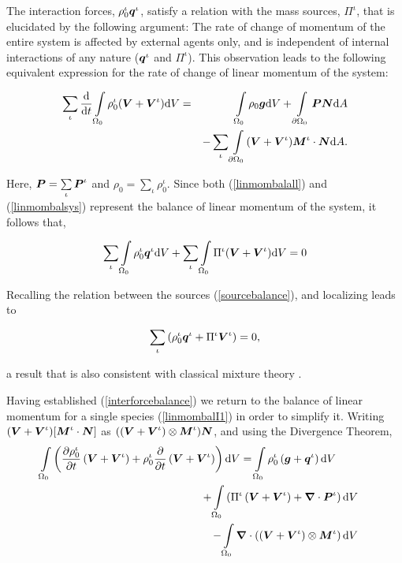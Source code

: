 The interaction forces, $\rho_0^\iota\mbox{\boldmath$ q$}^\iota$, satisfy a
relation with the mass sources, $\Pi^\iota$, that is elucidated by
the following argument: The rate of change of momentum of the
entire system is affected by external agents only, and is
independent of internal interactions of any nature ($\mbox{\boldmath$ q$}^\iota$
and $\Pi^\iota$). This observation leads to the following
equivalent expression for the rate of change of linear momentum of
the system:

\begin{eqnarray}
\sum\limits_{\iota}\frac{\mathrm{d}}{\mathrm{d}t}
\int\limits_{\Omega_0} \rho_0^\iota(\mbox{\boldmath$ V$}+\mbox{\boldmath$ V$}^\iota) \mathrm{d}V &=&
\int\limits_{\Omega_0}\rho_0\mbox{\boldmath$ g$} \mathrm{d}V +
\int\limits_{\partial \Omega_0}\mbox{\boldmath$ P$}\mbox{\boldmath$ N$} \mathrm{d}A \nonumber\\
& &- \sum\limits_{\iota}\int\limits_{\partial
\Omega_0}(\mbox{\boldmath$ V$}+\mbox{\boldmath$ V$}^\iota)\mbox{\boldmath$ M$}^\iota\cdot\mbox{\boldmath$ N$} \mathrm{d}A.
\label{linmombalsys}
\end{eqnarray}

\noindent Here, $\mbox{\boldmath$ P$} = \sum\limits_{\iota}\mbox{\boldmath$ P$}^\iota$ and
$\rho_0=\sum\limits_{\iota}\rho_0^\iota$. Since both
(\ref{linmombalall}) and (\ref{linmombalsys}) represent the
balance of linear momentum of the system, it follows that,

\begin{eqnarray}
\sum\limits_{\iota}\int\limits_{\Omega_0} \rho^\iota_0\mbox{\boldmath$ q$}^\iota
\mathrm{d}V + \sum\limits_{\iota}\int\limits_{\Omega_0}
\Pi^\iota(\mbox{\boldmath$ V$}+\mbox{\boldmath$ V$}^\iota) \mathrm{d}V = 0
\end{eqnarray}

Recalling the relation between the sources (\ref{sourcebalance}),
and localizing leads to

\begin{eqnarray}
\sum\limits_{\iota}\left(\rho^\iota_0\mbox{\boldmath$ q$}^\iota +
\Pi^\iota\mbox{\boldmath$ V$}^\iota\right)=0, \label{interforcebalance}
\end{eqnarray}

\noindent a result that is also consistent with classical mixture
theory \citep{TruesdellNoll:65}.

Having established (\ref{interforcebalance}) we return to the
balance of linear momentum for a single species
(\ref{linmombalI1}) in order to simplify it. Writing
$(\mbox{\boldmath$ V$}+\mbox{\boldmath$ V$}^\iota)[\mbox{\boldmath$ M$}^\iota\cdot\mbox{\boldmath$ N$}]$ as
$((\mbox{\boldmath$ V$}+\mbox{\boldmath$ V$}^\iota)\otimes\mbox{\boldmath$ M$}^\iota)\mbox{\boldmath$ N$}$, and using the Divergence
Theorem,
\begin{eqnarray}
\int\limits_{\Omega_0} \left(\frac{\partial\rho_0^\iota}{\partial
t}\left(\mbox{\boldmath$ V$}+\mbox{\boldmath$ V$}^\iota\right) +
\rho_0^\iota\frac{\partial}{\partial
t}\left(\mbox{\boldmath$ V$}+\mbox{\boldmath$ V$}^\iota\right)\right) \mathrm{d}V =
\int\limits_{\Omega_0}\rho^\iota_0\left(\mbox{\boldmath$ g$}+\mbox{\boldmath$ q$}^\iota\right)\mathrm{d}V\qquad& &\nonumber\\
+\int\limits_{\Omega_0}\left(\Pi^\iota\left(\mbox{\boldmath$ V$}+\mbox{\boldmath$ V$}^\iota\right) +
\mbox{\boldmath$\nabla$}\cdot\mbox{\boldmath$ P$}^\iota\right)
\mathrm{d}V& & \nonumber\\
-
\int\limits_{\Omega_0}\mbox{\boldmath$\nabla$}\cdot\left(\left(\mbox{\boldmath$ V$}+\mbox{\boldmath$ V$}^\iota\right)\otimes\mbox{\boldmath$ M$}^\iota\right)\mathrm{d}V
& &
\end{eqnarray}

